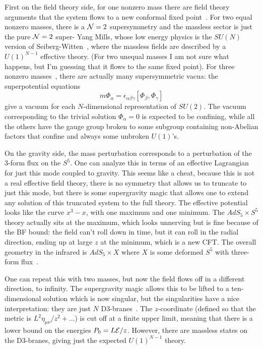 \documentclass[12pt]{article}
\begin{document}
{First on the field theory side, for one nonzero mass there are field theory arguments that the system flows to a new conformal fixed point~\cite{Leigh:1995ep}.  For two equal nonzero masses, there is a ${\cal N} = 2$ supersymmetry and the massless sector is just the pure ${\cal N} = 2$ super- Yang Mills, whose low energy physics is the $SU(N)$ version of Seiberg-Witten~\cite{Douglas:1995nw}, where the massless fields are described by a $U(1)^{N-1}$ effective theory.  (For two unequal masses I am not sure what happens, but I'm guessing that it flows to the same fixed point).  For three nonzero masses~\cite{Polchinski:2000uf}, there are actually many supersymmetric vacua: the superpotential equations 
\begin{equation}
\label{su2rep}
m\Phi_\alpha
= \epsilon_{\alpha\beta\gamma} [\Phi_\beta, \Phi_\gamma]
\end{equation}
give a vacuum for each $N$-dimensional representation of $SU(2)$.  The vacuum corresponding to the trivial solution $\Phi_\alpha = 0$ is expected to be confining, while all the others have the gauge group broken to some subgroup containing non-Abelian factors that confine and always some unbroken $U(1)$'s.

On the gravity side, the mass perturbation corresponds to a perturbation of the 3-form flux on the $S^5$.  One can analyze this in terms of an effective Lagrangian for just this mode coupled to gravity.  This seems like a cheat, because this is not a real effective field theory, there is no symmetry that allows us to truncate to just this mode, but there is some supergravity magic that allows one to extend any solution of this truncated system to the full theory.  The effective potential looks like the curve $x^3 - x$, with one maximum and one minimum.  The $AdS_5 \times S^5$ theory actually sits at the maximum, which looks unnerving but is fine because of the BF bound: the field can't roll down in time, but it can roll in the radial direction, ending up at large $z$ at the minimum, which is a new CFT.  The overall geometry in the infrared is $AdS_5 \times X$ where $X$ is some deformed $S^5$ with three-form flux~\cite{Khavaev:1998fb}.

One can repeat this with two masses, but now the field flows off in a different direction, to infinity.  The supergravity magic allows this to be lifted to a ten-dimensional solution which is now singular, but the singularities have a nice interpretation: they are just $N$ D3-branes~\cite{Pilch:2000ue,Buchel:2000cn}.  The $z$-coordinate (defined so that the metric is $L^2 \eta_{\mu\nu}/z^2 +\ldots$) is cut off at a finite upper limit, meaning that there is a lower bound on the energies $P_0 = L {\cal E}/z$.  However, there are massless states on the D3-branes, giving just the expected $U(1)^{N-1}$ theory.

}
\end{document}
